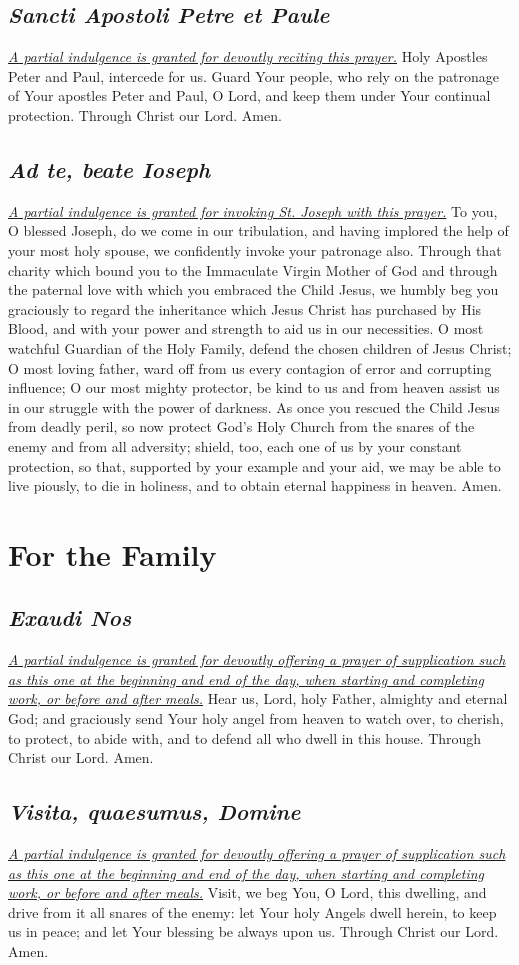 \documentclass[12pt]{article}
\newcommand{\prayersection}[1]{\section{#1}}
\newcommand{\prayertitle}[1]{\subsection{#1}}
\newcommand{\indulgencedprayertitle}[1]{\prayertitle{#1 \protect\kreuz}}
\newcommand{\foreign}[1]{\textsl{#1}}
\newcommand{\note}[1]{{\small{\textsl{#1}}}\newline}
\newcommand{\linkednote}[2]{\hyperlink{#1}{\note{#2}}}
\begin{document}
\indulgencedprayertitle{\foreign{Sancti Apostoli Petre et Paule}}
\linkednote{grant20}{A partial indulgence is granted for devoutly reciting this prayer.}
Holy Apostles Peter and Paul, intercede for us.
Guard Your people, who rely on the patronage of Your apostles Peter and Paul, O Lord, and keep them under Your continual protection.
Through Christ our Lord. Amen.

\indulgencedprayertitle{\foreign{Ad te, beate Ioseph}}
\linkednote{grant19}{A partial indulgence is granted for invoking St. Joseph with this prayer.}
To you, O blessed Joseph, do we come in our tribulation, and having implored the help of your most holy spouse, we confidently invoke your patronage also.
Through that charity which bound you to the Immaculate Virgin Mother of God and through the paternal love with which you embraced the Child Jesus, we humbly beg you graciously to regard the inheritance which Jesus Christ has purchased by His Blood, and with your power and strength to aid us in our necessities.
O most watchful Guardian of the Holy Family, defend the chosen children of Jesus Christ;
O most loving father, ward off from us every contagion of error and corrupting influence;
O our most mighty protector, be kind to us and from heaven assist us in our struggle with the power of darkness.
As once you rescued the Child Jesus from deadly peril, so now protect God’s Holy Church from the snares of the enemy and from all adversity;
shield, too, each one of us by your constant protection, so that, supported by your example and your aid, we may be able to live piously, to die in holiness, and to obtain eternal happiness in heaven.
Amen.

\newpage

\prayersection{For the Family}
\indulgencedprayertitle{\foreign{Exaudi Nos}}
\linkednote{grant26}{A partial indulgence is granted for devoutly offering a prayer of supplication such as this one at the beginning and end of the day, when starting and completing work, or before and after meals.}
Hear us, Lord, holy Father, almighty and eternal God;
and graciously send Your holy angel from heaven to watch over, to cherish, to protect, to abide with, and to defend all who dwell in this house.
Through Christ our Lord. Amen.

\indulgencedprayertitle{\foreign{Visita, quaesumus, Domine}}
\linkednote{grant26}{A partial indulgence is granted for devoutly offering a prayer of supplication such as this one at the beginning and end of the day, when starting and completing work, or before and after meals.}
Visit, we beg You, O Lord, this dwelling, and drive from it all snares of the enemy:
let Your holy Angels dwell herein, to keep us in peace;
and let Your blessing be always upon us.
Through Christ our Lord.
Amen.
\end{document}
